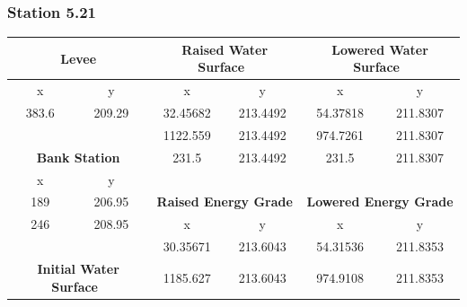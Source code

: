             \subsubsection{Station 5.21}
        \begin{center}
        \begin{tabular}{|cc|cc|cc|} 
            \hline
            \multicolumn{2}{|c|}{\textbf{Levee }}                    & \multicolumn{2}{c|}{\textbf{Raised Water Surface~ }}  & \multicolumn{2}{c|}{\textbf{Lowered Water Surface~ }}  \\ 
            \hline
            x        & y                                             & x        & y                                          & x        & y                                           \\
            383.6    & 209.29                                        & 32.45682 & 213.4492                                   & 54.37818 & 211.8307                                    \\
                     &                                               & 1122.559 & 213.4492                                   & 974.7261 & 211.8307                                    \\
            \multicolumn{2}{|c|}{\textbf{Bank Station }}             & 231.5    & 213.4492                                   & 231.5    & 211.8307                                    \\ 
            \cline{1-2}
            x        & y                                             &          &                                            &          &                                             \\
            189      & 206.95                                        & \multicolumn{2}{c|}{\textbf{Raised Energy Grade }}    & \multicolumn{2}{c|}{\textbf{Lowered Energy Grade }}    \\ 
            \cline{3-6}
            246      & 208.95                                        & x        & y                                          & x        & y                                           \\
                     &                                               & 30.35671 & 213.6043                                   & 54.31536 & 211.8353                                    \\
            \multicolumn{2}{|c|}{\textbf{Initial Water Surface~ }}   & 1185.627 & 213.6043                                   & 974.9108 & 211.8353                                    \\ 

\end{tabular}
\end{center}

